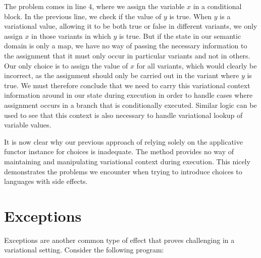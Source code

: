 \documentclass[onehalf,11pt]{beavtex}
\begin{document}
The problem comes in line 4, where we assign the variable $x$ in a conditional block. In the previous line, we check if the value of
$y$ is true. When $y$ is a variational value, allowing it to be both true or false in different variants, we only assign $x$ in those variants
in which $y$ is true. But if the state in our semantic domain is only a map, we have no way of passing the necessary information to the
assignment that it must only occur in particular variants and not in others. Our only choice is to assign the value of $x$ for all variants,
which would clearly be incorrect, as the assignment should only be carried out in the variant where $y$ is true. We must therefore
conclude that we need to carry this variational context information around in our state during execution in order to handle cases where
assignment occurs in a branch that is conditionally executed. Similar logic can be used to see that this context is also necessary to handle
variational lookup of variable values.

It is now clear why our previous approach of relying solely on the applicative functor instance for choices is inadequate. The method provides
no way of maintaining and manipulating variational context during execution. This nicely demonstrates the problems we encounter when
trying to introduce choices to languages with side effects.

%
%
%
% 

\section{Exceptions}

Exceptions are another common type of effect that proves challenging in a variational setting.
Consider the following program:
\end{document}
